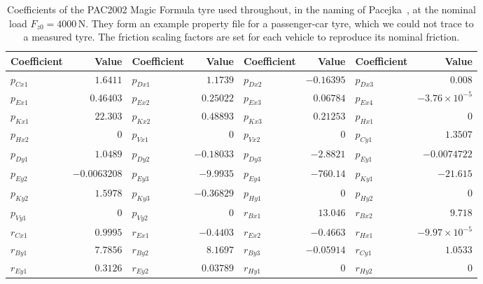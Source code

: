 \begin{table}[htbp]
\centering\small
\setlength{\tabcolsep}{3pt}
\caption{Coefficients of the PAC2002 Magic Formula tyre used throughout, in the naming of Pacejka~\cite{Pacejka2012}, at the nominal load $F_{z0}=4000$\,N. They form an example property file for a passenger-car tyre, which we could not trace to a measured tyre. The friction scaling factors are set for each vehicle to reproduce its nominal friction.}\label{tab:app-mf}
\begin{tabular}{lrlrlrlr}
\toprule
Coefficient & Value & Coefficient & Value & Coefficient & Value & Coefficient & Value\\
\midrule
$p_{Cx1}$ & $1.6411$ & $p_{Dx1}$ & $1.1739$ & $p_{Dx2}$ & $-0.16395$ & $p_{Dx3}$ & $0.008$\\
$p_{Ex1}$ & $0.46403$ & $p_{Ex2}$ & $0.25022$ & $p_{Ex3}$ & $0.06784$ & $p_{Ex4}$ & $-3.76\times10^{-5}$\\
$p_{Kx1}$ & $22.303$ & $p_{Kx2}$ & $0.48893$ & $p_{Kx3}$ & $0.21253$ & $p_{Hx1}$ & $0$\\
$p_{Hx2}$ & $0$ & $p_{Vx1}$ & $0$ & $p_{Vx2}$ & $0$ & $p_{Cy1}$ & $1.3507$\\
$p_{Dy1}$ & $1.0489$ & $p_{Dy2}$ & $-0.18033$ & $p_{Dy3}$ & $-2.8821$ & $p_{Ey1}$ & $-0.0074722$\\
$p_{Ey2}$ & $-0.0063208$ & $p_{Ey3}$ & $-9.9935$ & $p_{Ey4}$ & $-760.14$ & $p_{Ky1}$ & $-21.615$\\
$p_{Ky2}$ & $1.5978$ & $p_{Ky3}$ & $-0.36829$ & $p_{Hy1}$ & $0$ & $p_{Hy2}$ & $0$\\
$p_{Vy1}$ & $0$ & $p_{Vy2}$ & $0$ & $r_{Bx1}$ & $13.046$ & $r_{Bx2}$ & $9.718$\\
$r_{Cx1}$ & $0.9995$ & $r_{Ex1}$ & $-0.4403$ & $r_{Ex2}$ & $-0.4663$ & $r_{Hx1}$ & $-9.97\times10^{-5}$\\
$r_{By1}$ & $7.7856$ & $r_{By2}$ & $8.1697$ & $r_{By3}$ & $-0.05914$ & $r_{Cy1}$ & $1.0533$\\
$r_{Ey1}$ & $0.3126$ & $r_{Ey2}$ & $0.03789$ & $r_{Hy1}$ & $0$ & $r_{Hy2}$ & $0$\\
\bottomrule
\end{tabular}
\end{table}
